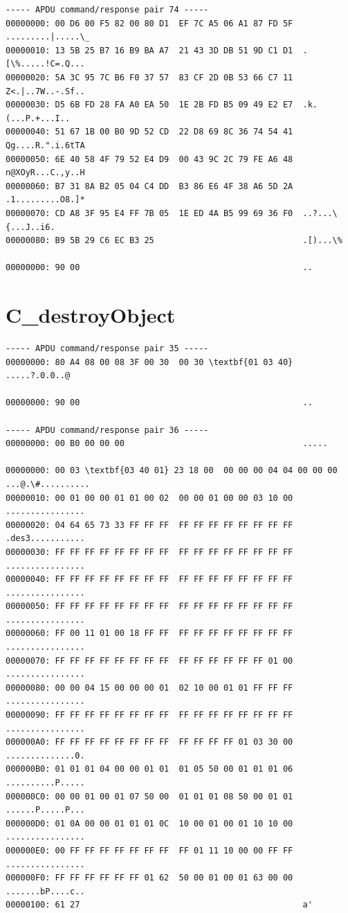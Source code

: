 \documentclass[bsc,frontabs,twoside,singlespacing,parskip,deptreport]{infthesis}     %
\begin{document}
\begin{appendices}
\begin{Verbatim}[commandchars=\\\{\}, fontsize=\small]
----- APDU command/response pair 74 -----
00000000: 00 D6 00 F5 82 00 80 D1  EF 7C A5 06 A1 87 FD 5F  .........|.....\_
00000010: 13 5B 25 B7 16 B9 BA A7  21 43 3D DB 51 9D C1 D1  .[\%.....!C=.Q...
00000020: 5A 3C 95 7C B6 F0 37 57  83 CF 2D 0B 53 66 C7 11  Z<.|..7W..-.Sf..
00000030: D5 6B FD 28 FA A0 EA 50  1E 2B FD B5 09 49 E2 E7  .k.(...P.+...I..
00000040: 51 67 1B 00 B0 9D 52 CD  22 D8 69 8C 36 74 54 41  Qg....R.".i.6tTA
00000050: 6E 40 58 4F 79 52 E4 D9  00 43 9C 2C 79 FE A6 48  n@XOyR...C.,y..H
00000060: B7 31 8A B2 05 04 C4 DD  B3 86 E6 4F 38 A6 5D 2A  .1.........O8.]*
00000070: CD A8 3F 95 E4 FF 7B 05  1E ED 4A B5 99 69 36 F0  ..?...\{...J..i6.
00000080: B9 5B 29 C6 EC B3 25                              .[)...\%

00000000: 90 00                                             ..

\end{Verbatim}



\section{C\_destroyObject}
\begin{Verbatim}[commandchars=\\\{\}, fontsize=\small]
----- APDU command/response pair 35 -----
00000000: 80 A4 08 00 08 3F 00 30  00 30 \textbf{01 03 40}           .....?.0.0..@

00000000: 90 00                                             ..

----- APDU command/response pair 36 -----
00000000: 00 B0 00 00 00                                    .....

00000000: 00 03 \textbf{03 40 01} 23 18 00  00 00 00 04 04 00 00 00  ...@.\#..........
00000010: 00 01 00 00 01 01 00 02  00 00 01 00 00 03 10 00  ................
00000020: 04 64 65 73 33 FF FF FF  FF FF FF FF FF FF FF FF  .des3...........
00000030: FF FF FF FF FF FF FF FF  FF FF FF FF FF FF FF FF  ................
00000040: FF FF FF FF FF FF FF FF  FF FF FF FF FF FF FF FF  ................
00000050: FF FF FF FF FF FF FF FF  FF FF FF FF FF FF FF FF  ................
00000060: FF 00 11 01 00 18 FF FF  FF FF FF FF FF FF FF FF  ................
00000070: FF FF FF FF FF FF FF FF  FF FF FF FF FF FF 01 00  ................
00000080: 00 00 04 15 00 00 00 01  02 10 00 01 01 FF FF FF  ................
00000090: FF FF FF FF FF FF FF FF  FF FF FF FF FF FF FF FF  ................
000000A0: FF FF FF FF FF FF FF FF  FF FF FF FF 01 03 30 00  ..............0.
000000B0: 01 01 01 04 00 00 01 01  01 05 50 00 01 01 01 06  ..........P.....
000000C0: 00 00 01 00 01 07 50 00  01 01 01 08 50 00 01 01  ......P.....P...
000000D0: 01 0A 00 00 01 01 01 0C  10 00 01 00 01 10 10 00  ................
000000E0: 00 FF FF FF FF FF FF FF  FF 01 11 10 00 00 FF FF  ................
000000F0: FF FF FF FF FF FF 01 62  50 00 01 00 01 63 00 00  .......bP....c..
00000100: 61 27                                             a'



\end{Verbatim}
\end{appendices}
\end{document}
